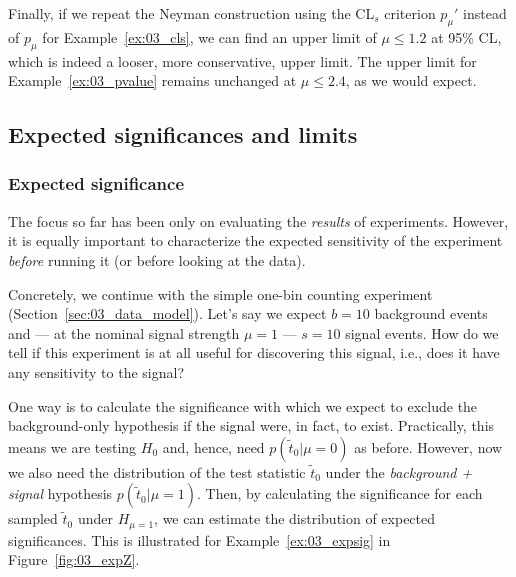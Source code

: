 Finally, if we repeat the Neyman construction using the CL$_s$ criterion $p_\mu'$ instead of $p_\mu$ for Example~\ref{ex:03_cls}, we can find an upper limit of $\mu \leq 1.2$ at 95\% CL, which is indeed a looser, more conservative, upper limit.
The upper limit for Example~\ref{ex:03_pvalue} remains unchanged at $\mu \leq 2.4$, as we would expect.


\subsection{Expected significances and limits}
\label{sec:03_expected}

\subsubsection{Expected significance}

The focus so far has been only on evaluating the \textit{results} of experiments.
However, it is equally important to characterize the expected sensitivity of the experiment \textit{before} running it (or before looking at the data).

\begin{example}
\label{ex:03_expsig}
Concretely, we continue with the simple one-bin counting experiment (Section~\ref{sec:03_data_model}).
Let's say we expect $b = 10$ background events and --- at the nominal signal strength $\mu = 1$ --- $s = 10$ signal events.
How do we tell if this experiment is at all useful for discovering this signal, i.e., does it have any sensitivity to the signal?
\end{example}

One way is to calculate the significance with which we expect to exclude the background-only hypothesis if the signal were, in fact, to exist.
Practically, this means we are testing $H_0$ and, hence, need $p(\tilde{t}_0|\mu = 0)$ as before. However, now we also need the distribution of the test statistic $\tilde{t}_0$ under the \textit{background + signal} hypothesis $p(\tilde{t}_0|\mu = 1)$.
Then, by calculating the significance for each sampled $\tilde{t}_0$ under $H_{\mu = 1}$, we can estimate the distribution of expected significances.
This is illustrated for Example~\ref{ex:03_expsig} in Figure~\ref{fig:03_expZ}.

